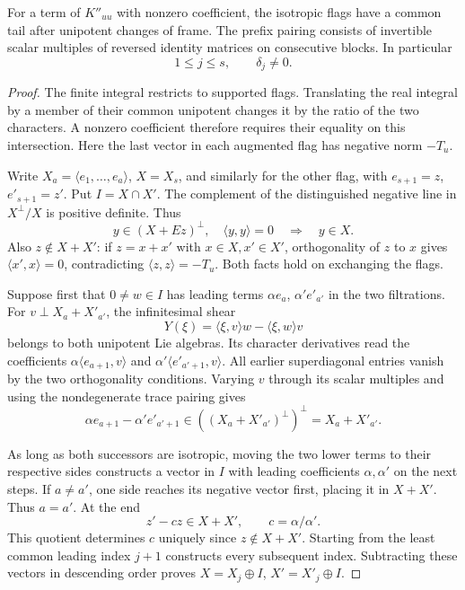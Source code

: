 \begin{auxlemma}\label{lem:zero-gram-positive-rank}
For a term of \(K''_{uu}\) with nonzero coefficient, the isotropic flags have a common tail after unipotent changes of frame. The prefix pairing consists of invertible scalar multiples of reversed identity matrices on consecutive blocks. In particular
\[
                 1\le j\le s,\qquad \delta_j\ne0.
\]
\end{auxlemma}
\begin{proof}
The finite integral restricts to supported flags. Translating the real integral by a member of their common unipotent changes it by the ratio of the two characters. A nonzero coefficient therefore requires their equality on this intersection. Here the last vector in each augmented flag has negative norm \(-T_u\). 

Write \(X_a=\langle e_1,\ldots,e_a\rangle\), \(X=X_s\), and similarly for the other flag, with \(e_{s+1}=z\), \(e'_{s+1}=z'\). Put \(I=X\cap X'\). The complement of the distinguished negative line in \(X^\perp/X\) is positive definite. Thus
\[
   y\in(X+Ez)^\perp,\quad\langle y,y\rangle=0
                      \quad\Longrightarrow\quad y\in X .
\]
Also \(z\notin X+X'\): if \(z=x+x'\) with \(x\in X,x'\in X'\), orthogonality of \(z\) to \(x\) gives \(\langle x',x\rangle=0\), contradicting \(\langle z,z\rangle=-T_u\). Both facts hold on exchanging the flags.

Suppose first that \(0\ne w\in I\) has leading terms \(\alpha e_a\), \(\alpha'e'_{a'}\) in the two filtrations. For \(v\perp X_a+X'_{a'}\), the infinitesimal shear
\[
       Y(\xi)=\langle\xi,v\rangle w-\langle\xi,w\rangle v
\]
belongs to both unipotent Lie algebras. Its character derivatives read the coefficients \(\alpha\langle e_{a+1},v\rangle\) and \(\alpha'\langle e'_{a'+1},v\rangle\). All earlier superdiagonal entries vanish by the two orthogonality conditions. Varying \(v\) through its scalar multiples and using the nondegenerate trace pairing gives
\[
  \alpha e_{a+1}-\alpha'e'_{a'+1}\in
    ((X_a+X'_{a'})^\perp)^\perp=X_a+X'_{a'} .
\]


As long as both successors are isotropic, moving the two lower terms to their respective sides constructs a vector in \(I\) with leading coefficients \(\alpha,\alpha'\) on the next steps. If \(a\ne a'\), one side reaches its negative vector first, placing it in \(X+X'\). Thus \(a=a'\). At the end
\[
       z'-cz\in X+X',\qquad c=\alpha/\alpha' .
\]
This quotient determines \(c\) uniquely since \(z\notin X+X'\). Starting from the least common leading index \(j+1\) constructs every subsequent index. Subtracting these vectors in descending order proves \(X=X_j\oplus I\), \(X'=X'_j\oplus I\).


\end{proof}
